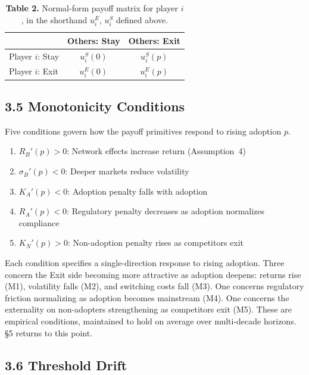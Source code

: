 \documentclass[12pt]{article}
\theoremstyle{definition}
\theoremstyle{remark}
\begin{document}
\begin{table}[h]
\centering
\caption*{\textbf{Table 2.} Normal-form payoff matrix for player $i$, in the shorthand $u_i^E$, $u_i^S$ defined above.}
\begin{tabular}{lcc}
\toprule
 & Others: Stay & Others: Exit \\
\midrule
Player $i$: Stay & $u_i^S(0)$ & $u_i^S(p)$ \\
Player $i$: Exit & $u_i^E(0)$ & $u_i^E(p)$ \\
\bottomrule
\end{tabular}
\end{table}

\subsection{3.5 Monotonicity Conditions}

Five conditions govern how the payoff primitives respond to rising adoption $p$.

\begin{enumerate}[label=(M\arabic*),nosep]
\item $R_B'(p) > 0$: Network effects increase return (Assumption~4)
\item $\sigma_B'(p) < 0$: Deeper markets reduce volatility
\item $K_A'(p) < 0$: Adoption penalty falls with adoption
\item $R_A'(p) < 0$: Regulatory penalty decreases as adoption normalizes compliance
\item $K_N'(p) > 0$: Non-adoption penalty rises as competitors exit
\end{enumerate}

\smallskip
\noindent Each condition specifies a single-direction response to
rising adoption. Three concern the
Exit side becoming more attractive as adoption deepens: returns
rise (M1), volatility falls (M2), and switching costs fall (M3).
One concerns regulatory friction normalizing as adoption becomes
mainstream (M4). One concerns the externality on non-adopters
strengthening as competitors exit (M5). These are empirical conditions, maintained to hold on average over multi-decade horizons. \S5 returns to this point.

\subsection{3.6 Threshold Drift}
\end{document}

